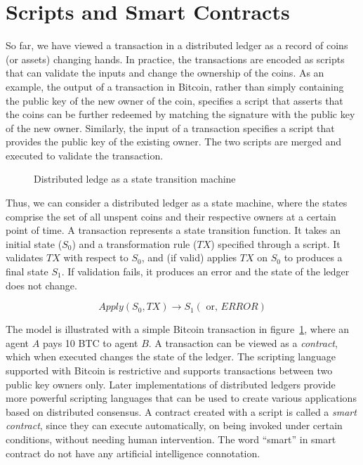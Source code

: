 \section{Scripts and Smart Contracts}

So far, we have viewed a transaction in a distributed ledger as a record of coins (or assets) changing hands. In practice, the 
transactions are encoded as scripts that can validate the inputs and change the ownership of the coins. As an example, the output 
of a transaction in Bitcoin, rather than simply containing the public key of the new owner of the coin, specifies a script that 
asserts that the coins can be further redeemed by matching the signature with the public key of the new owner. Similarly, the 
input of a transaction specifies a script that provides the public key of the existing owner. The two scripts are merged and 
executed to validate the transaction.


\begin{figure}[!htbp]
	\centerline{
	}
	\caption{Distributed ledge as a state transition machine}
	\label{fig:ledger:state-machine} 
\end{figure}

Thus, we can consider a distributed ledger as a state machine, where the states comprise the set of all unspent coins and their 
respective owners at a certain point of time. A transaction represents a state transition function. It takes an initial state 
($S_0$) and a transformation rule ($TX$) specified through a script. It validates $TX$ with respect to $S_0$, and (if valid) applies 
$TX$ on $S_0$  to produces a final state $S_1$. If validation fails, it produces an error and the state of the ledger does 
not change.  

\begin{equation}
	Apply(S_0, TX) \rightarrow S_1 (\text{ or, } ERROR) 	
\end{equation}

The model is illustrated with a simple Bitcoin transaction in figure~\ref{fig:ledger:state-machine}, where an agent $A$
pays 10 BTC to agent $B$. A transaction can be viewed as a {\em contract}, which when executed changes the state of the ledger. 
The scripting language supported with Bitcoin is restrictive and supports transactions between two public key owners only. 
Later implementations of distributed ledgers provide more powerful scripting languages that can be used to create various 
applications based on distributed consensus. A contract created with a script is called a {\em smart contract}, since they 
can execute automatically, on being invoked under certain conditions, without needing human intervention. The word 
``smart'' in smart contract do not have any artificial intelligence connotation. 

